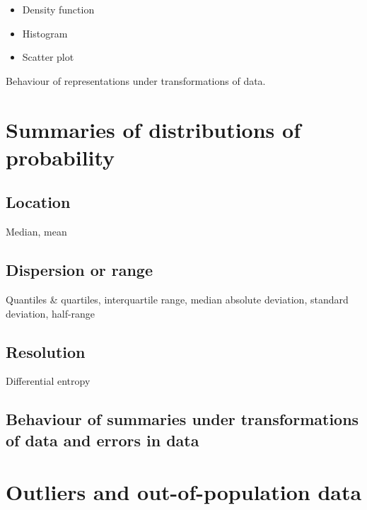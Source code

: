 \documentclass[
  a4paper,
  DIV=11,
  numbers=noendperiod,
  oneside]{scrreprt}
\begin{document}
\begin{itemize}
\item
  Density function
\item
  Histogram
\item
  Scatter plot
\end{itemize}

Behaviour of representations under transformations of data.

\hypertarget{summaries-of-distributions-of-probability}{%
\section{Summaries of distributions of
probability}\label{summaries-of-distributions-of-probability}}

\hypertarget{location}{%
\subsection{Location}\label{location}}

Median, mean

\hypertarget{dispersion-or-range}{%
\subsection{Dispersion or range}\label{dispersion-or-range}}

Quantiles \& quartiles, interquartile range, median absolute deviation,
standard deviation, half-range

\hypertarget{resolution}{%
\subsection{Resolution}\label{resolution}}

Differential entropy

\hypertarget{behaviour-of-summaries-under-transformations-of-data-and-errors-in-data}{%
\subsection{Behaviour of summaries under transformations of data and
errors in
data}\label{behaviour-of-summaries-under-transformations-of-data-and-errors-in-data}}

\hypertarget{outliers-and-out-of-population-data}{%
\section{Outliers and out-of-population
data}\label{outliers-and-out-of-population-data}}
\end{document}
